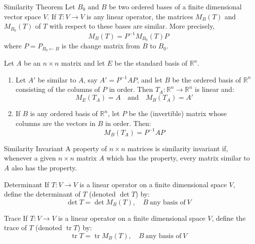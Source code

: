 \documentclass[12pt]{article}
\begin{document}
\begin{theorem}{Similarity Theorem}{}
    Let $ B_0 $ and $ B $ be two ordered bases of a finite dimensional vector space $ V $. If $ T : V \to V $ is any linear operator, the matrices $ M_B \left( T \right) $ and $ M_{B_0} \left( T \right) $ of $ T $ with respect to these bases are similar. More precisely,
    \[ M_B \left( T \right) = P^{-1} M_{B_0} \left( T \right) P \]
    where $ P = P_{{B_0} \leftarrow B} $ is the change matrix from $ B $ to $ B_0 $.
\end{theorem}

\begin{theorem}{}{}
    Let $ A $ be an $ n \times n $ matrix and let $ E $ be the standard basis of $ \mathbb{R}^n $.
    \begin{enumerate}[label=(\roman*)]
        \item Let $ A' $ be similar to $ A $, say $ A' = P^{-1} AP $, and let $ B $ be the ordered basis of $ \mathbb{R}^n $ consisting of the columns of $ P $ in order. Then $ T_A : \mathbb{R}^n \to \mathbb{R}^n $ is linear and:
        \[ M_E \left( T_A \right) = A \quad \text{and} \quad M_B \left( T_A \right) = A' \]
        \item If $ B $ is any ordered basis of $ \mathbb{R}^n $, let $ P $ be the (invertible) matrix whose columns are the vectors in $ B $ in order. Then:
        \[ M_B \left( T_A \right) = P^{-1} AP \]
    \end{enumerate}
\end{theorem}

\begin{definition}{Similarity Invariant}{}
    A property of $ n \times n $ matrices is similarity invariant if, whenever a given $ n \times n $ matrix $ A $ which has the property, every matrix similar to $ A $ also has the property. 
\end{definition}

\begin{definition}{Determinant}{}
    If $ T : V \to V $ is a linear operator on a finite dimensional space $ V $, define the determinant of $ T $ (denoted $ \det T $) by:
    \[ \det T = \det M_B \left( T \right), \quad B \ \text{any basis of} \ V \]
\end{definition}

\begin{definition}{Trace}{}
    If $ T : V \to V $ is a linear operator on a finite dimensional space $ V $, define the trace of $ T $ (denoted $ \operatorname{tr} T $) by:
    \[ \operatorname{tr} T = \operatorname{tr} M_B \left( T \right), \quad B \ \text{any basis of} \ V \]
\end{definition}
\end{document}
